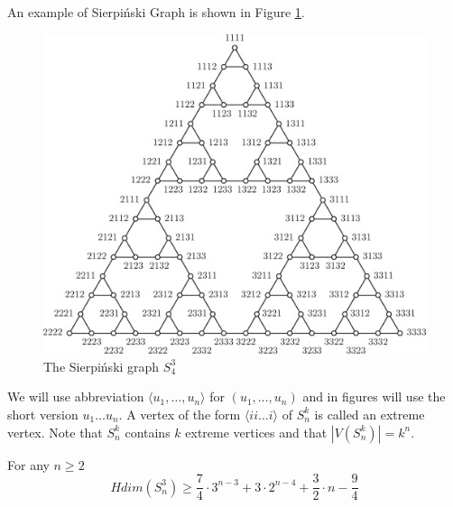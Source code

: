 \documentclass[12pt,a4paper,titlepage,openany]{report}
\begin{document}
An example of Sierpi\'nski Graph is shown in Figure \ref{fig:spierpinski}.
\begin{figure}[h]
\begin{center}
\includegraphics[width=1\linewidth]{figures/sierpinski.png}
\end{center}
\caption{The Sierpi\'nski graph $S^3_4$}\label{fig:spierpinski}
\end{figure}
We will use abbreviation $\langle u_1,\ldots, u_n \rangle$ for $(u_1,\ldots, u_n)$ and in figures will use the short version $u_1\ldots u_n$. \newline
A vertex of the form $\langle ii \ldots i \rangle$ of $S^k_n$ is called an extreme vertex. Note that $S^k_n$ contains $k$ extreme vertices and that $| V ( S^k_n )| = k^n$.

\begin{theorem}
For any $n\geq 2$
$$Hdim( S^3_n)\geq \frac{7}{4}\cdot 3^{n-3}+3\cdot 2^{n-4}+\frac{3}{2}\cdot n-\frac{9}{4}$$
\end{theorem}
\end{document}
